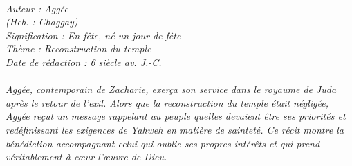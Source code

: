 \BFont
\noindent\hrulefill
{\footnotesize
\textit{
\bigskip
{\centering{}
\\Auteur : Aggée
\\(Heb. : Chaggay)
\\Signification : En fête, né un jour de fête
\\Thème : Reconstruction du temple
\\Date de rédaction : 6 siècle av. J.-C.\\}
}
\textit{
\\Aggée, contemporain de Zacharie, exerça son service dans le royaume de Juda après le retour de l'exil. Alors que la reconstruction du temple était négligée, Aggée reçut un message rappelant au peuple quelles devaient être ses priorités et redéfinissant les exigences de Yahweh en matière de sainteté. Ce récit montre la bénédiction accompagnant celui qui oublie ses propres intérêts et qui prend véritablement à cœur l'œuvre de Dieu.\bigskip
}
}
\par\nobreak\noindent\hrulefill
